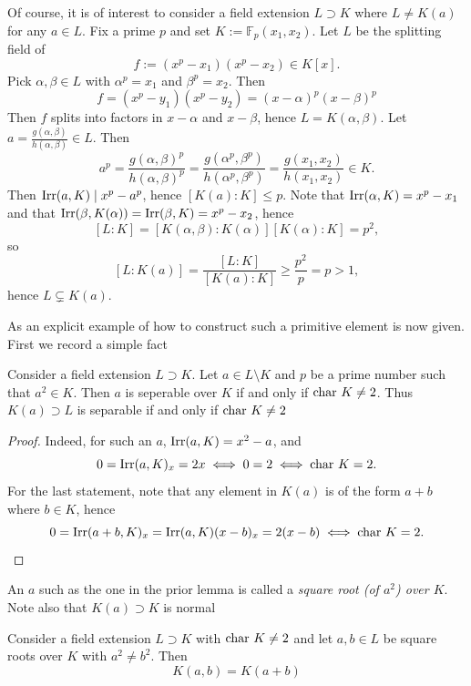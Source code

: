     \begin{example}\label{ExplicitExampleOfFieldExtensionWithoutPrimitiveElement}
        Of course, it is of interest to consider a field extension $L\supset K$ where $L\neq K(a)$ for any $a\in L$. Fix a prime $p$ and set $K := \mathbb{F}_p(x_1,x_2)$. Let $L$ be the splitting field of 
        $$
            f:=(x^p-x_1)(x^p-x_2)\in K[x].
        $$
        Pick $\alpha,\beta\in L$ with $\alpha^p = x_1$ and $\beta^p=x_2$. Then 
        $$
            f = (x^p-y_1)(x^p-y_2) = (x-\alpha)^p(x-\beta)^p
        $$
        Then $f$ splits into factors in $x-\alpha$ and $x-\beta$, hence $L=K(\alpha,\beta)$. Let $a=\frac{g(\alpha,\beta)}{h(\alpha,\beta)}\in L$. Then 
        $$
            a^p = \frac{g(\alpha,\beta)^p}{h(\alpha,\beta)^p} = \frac{g(\alpha^p,\beta^p)}{h(\alpha^p,\beta^p)}=\frac{g(x_1,x_2)}{h(x_1,x_2)}\in K.
        $$
        Then $\mathrm{Irr}(a,K) \mid x^p-a^p$, hence $[K(a): K]\leq p$. Note that $\mathrm{Irr}(\alpha,K) = x^p - x_1$ and that 
        $\mathrm{Irr}(\beta,K(\alpha)) = \mathrm{Irr}(\beta,K) = x^p-x_2$, hence 
        $$
            [L:K] = [K(\alpha,\beta) :K(\alpha)][K(\alpha):K] = p^2,
        $$
        so 
        $$
            [L : K(a)] = \frac{[L:K]}{[K(a):K]} \geq \frac{p^2}{p} = p >1,
        $$
        hence $L\subsetneq K(a)$. 
    \end{example}
    As an explicit example of how to construct such a primitive element is now given. First we record a simple fact
    \begin{lemma}
        Consider a field extension $L\supset K$. Let $a\in L\setminus K$ and $p$ be a prime number such that $a^2\in K$. Then $a$ is seperable over $K$ if and only if $\mathrm{char} \ K \neq 2$. Thus $K(a)\supset L$ is separable if and only if $\mathrm{char} \ K \neq 2$
    \end{lemma}
    \begin{proof}
        Indeed, for such an $a$, $\mathrm{Irr}(a,K) = x^2-a$, and 
        $$
            0=\mathrm{Irr}(a,K)_x=2x \iff 0=2 \iff \mathrm{char} \ K = 2.
        $$
        For the last statement, note that any element in $K(a)$ is of the form $a+b$ where $b\in K$, hence 
        $$
            0 = \mathrm{Irr}(a+b,K)_x = \mathrm{Irr}(a,K)(x-b)_x = 2(x-b) \iff \mathrm{char} \ K = 2.
        $$ 
    \end{proof}
    \begin{remark}
        An $a$ such as the one in the prior lemma is called a \emph{square root (of $a^2$) over $K$}. Note also that $K(a)\supset K$ is normal 
    \end{remark}
    \begin{proposition}
        Consider a field extension $L\supset K$ with $\mathrm{char}\ K \neq 2$ and let $a,b\in L$ be square roots over $K$ with $a^2\neq b^2$. Then 
        $$
            K(a,b) = K(a+b)
        $$
    \end{proposition}
